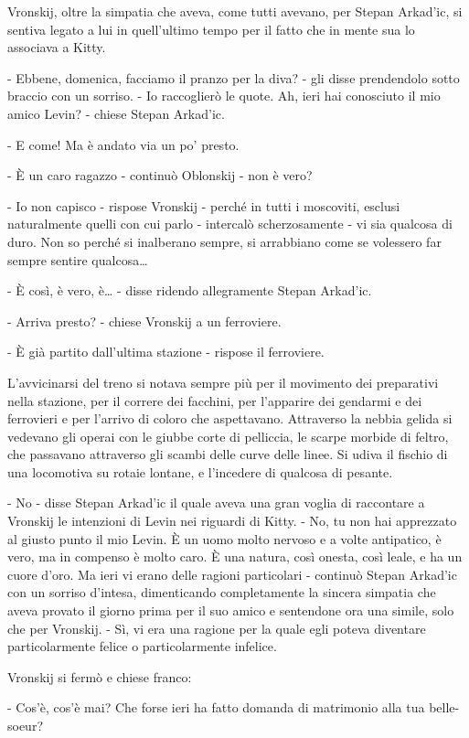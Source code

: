 Vronskij, oltre la simpatia che aveva, come tutti avevano, per Stepan Arkad'ic, si sentiva legato a lui in quell'ultimo tempo per il fatto che in mente sua lo associava a Kitty. 

- Ebbene, domenica, facciamo il pranzo per la diva? - gli disse prendendolo sotto braccio con un sorriso. - Io raccoglierò le quote. Ah, ieri hai conosciuto il mio amico Levin? - chiese Stepan Arkad'ic. 

- E come! Ma è andato via un po' presto. 

- È un caro ragazzo - continuò Oblonskij - non è vero? 

- Io non capisco - rispose Vronskij - perché in tutti i moscoviti, esclusi naturalmente quelli con cui parlo - intercalò scherzosamente - vi sia qualcosa di duro. Non so perché si inalberano sempre, si arrabbiano come se volessero far sempre sentire qualcosa\ldots{} 

- È così, è vero, è\ldots{} - disse ridendo allegramente Stepan Arkad'ic. 

- Arriva presto? - chiese Vronskij a un ferroviere. 

- È già partito dall'ultima stazione - rispose il ferroviere. 

L'avvicinarsi del treno si notava sempre più per il movimento dei preparativi nella stazione, per il correre dei facchini, per l'apparire dei gendarmi e dei ferrovieri e per l'arrivo di coloro che aspettavano. Attraverso la nebbia gelida si vedevano gli operai con le giubbe corte di pelliccia, le scarpe morbide di feltro, che passavano attraverso gli scambi delle curve delle linee. Si udiva il fischio di una locomotiva su rotaie lontane, e l'incedere di qualcosa di pesante. 

- No - disse Stepan Arkad'ic il quale aveva una gran voglia di raccontare a Vronskij le intenzioni di Levin nei riguardi di Kitty. - No, tu non hai apprezzato al giusto punto il mio Levin. È un uomo molto nervoso e a volte antipatico, è vero, ma in compenso è molto caro. È una natura, così onesta, così leale, e ha un cuore d'oro. Ma ieri vi erano delle ragioni particolari - continuò Stepan Arkad'ic con un sorriso d'intesa, dimenticando completamente la sincera simpatia che aveva provato il giorno prima per il suo amico e sentendone ora una simile, solo che per Vronskij. - Sì, vi era una ragione per la quale egli poteva diventare particolarmente felice o particolarmente infelice. 

Vronskij si fermò e chiese franco: 

- Cos'è, cos'è mai? Che forse ieri ha fatto domanda di matrimonio alla tua belle-soeur? 


